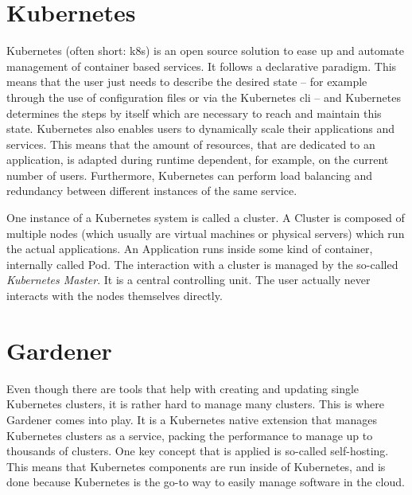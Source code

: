 \section{Kubernetes}
\label{sec:kubernetes}
Kubernetes (often short: k8s) is an open source solution to ease up and automate management of container based services.
It follows a declarative paradigm.
This means that the user just needs to describe the desired state -- for example through the use of configuration files or via the Kubernetes \ac{cli} -- and Kubernetes determines the steps by itself which are necessary to reach and maintain this state.
Kubernetes also enables users to dynamically scale their applications and services.
This means that the amount of resources, that are dedicated to an application, is adapted during runtime dependent, for example, on the current number of users.
Furthermore, Kubernetes can perform load balancing and redundancy between different instances of the same service.
\cite{Bloß2019, wasistk8s}

One instance of a Kubernetes system is called a cluster.
A Cluster is composed of multiple nodes (which usually are virtual machines or physical servers) which run the actual applications.
An Application runs inside some kind of container, internally called Pod.
The interaction with a cluster is managed by the so-called \emph{Kubernetes Master}.
It is a central controlling unit.
The user actually never interacts with the nodes themselves directly.
\cite{k8skonzepte}

\section{Gardener}
Even though there are tools that help with creating and updating single Kubernetes clusters, it is rather hard to manage many clusters.
This is where Gardener comes into play.
It is a Kubernetes native extension that manages Kubernetes clusters as a service, packing the performance to manage up to thousands of clusters.
One key concept that is applied is so-called self-hosting.
This means that Kubernetes components are run inside of Kubernetes, and is done because Kubernetes is the go-to way to easily manage software in the cloud. \cite{gardener.architecture, gardener.blog1, gardener.blog2, gardener.cloud}

